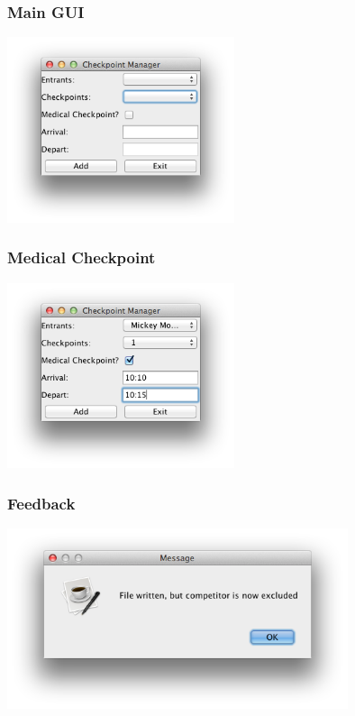 \documentclass[10pt, a4paper]{article}
\begin{document}
\subsubsection{Main GUI}
\begin{center}
\includegraphics[width=0.5\textwidth]{./screenshots/main-gui.png}
\end{center}

\subsubsection{Medical Checkpoint}
\begin{center}
\includegraphics[width=0.5\textwidth]{./screenshots/medical.png}
\end{center}

\subsubsection{Feedback}
\begin{center}
\includegraphics[width=0.75\textwidth]{./screenshots/feedback.png}
\end{center}
\end{document}
